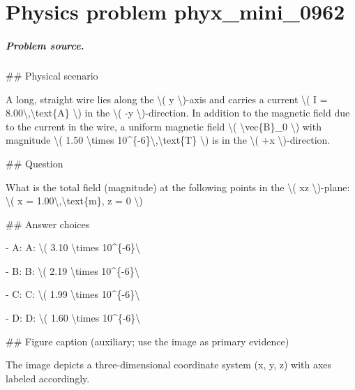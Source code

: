 
\chapter{Physics problem phyx\_mini\_0962}
\label{ch:PhyXMiniProblems_problem_phyx_mini_0962}

\paragraph{Problem source.}
\#\# Physical scenario

A long, straight wire lies along the \textbackslash{}( y \textbackslash{})-axis and carries a current \textbackslash{}( I = 8.00\textbackslash{},\textbackslash{}text\{A\} \textbackslash{}) in the \textbackslash{}( -y \textbackslash{})-direction. In addition to the magnetic field due to the current in the wire, a uniform magnetic field \textbackslash{}( \textbackslash{}vec\{B\}\_0 \textbackslash{}) with magnitude \textbackslash{}( 1.50 \textbackslash{}times 10\textasciicircum{}\{-6\}\textbackslash{},\textbackslash{}text\{T\} \textbackslash{}) is in the \textbackslash{}( +x \textbackslash{})-direction.

\#\# Question

What is the total field (magnitude) at the following points in the \textbackslash{}( xz \textbackslash{})-plane: \textbackslash{}( x = 1.00\textbackslash{},\textbackslash{}text\{m\}, z = 0 \textbackslash{})

\#\# Answer choices

- A: A: \textbackslash{}( 3.10 \textbackslash{}times 10\textasciicircum{}\{-6\}\textbackslash{}

- B: B: \textbackslash{}( 2.19 \textbackslash{}times 10\textasciicircum{}\{-6\}\textbackslash{}

- C: C: \textbackslash{}( 1.99 \textbackslash{}times 10\textasciicircum{}\{-6\}\textbackslash{}

- D: D: \textbackslash{}( 1.60 \textbackslash{}times 10\textasciicircum{}\{-6\}\textbackslash{}

\#\# Figure caption (auxiliary; use the image as primary evidence)

The image depicts a three-dimensional coordinate system (x, y, z) with axes labeled accordingly. 


